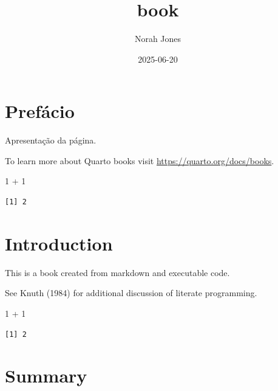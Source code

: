 \documentclass[
  letterpaper,
  DIV=11,
  numbers=noendperiod]{scrreprt}
\title{book}
\author{Norah Jones}
\date{2025-06-20}
\newenvironment{Shaded}{\begin{snugshade}}{\end{snugshade}}
\newcommand{\DecValTok}[1]{\textcolor[rgb]{0.68,0.00,0.00}{#1}}
\newcommand{\SpecialCharTok}[1]{\textcolor[rgb]{0.37,0.37,0.37}{#1}}
\renewcommand*\contentsname{Table of contents}
\newcommand\contentsname{Table of contents}
\begin{document}
\maketitle

\renewcommand*\contentsname{Table of contents}
{
\hypersetup{linkcolor=}
\setcounter{tocdepth}{2}
\tableofcontents
}


\chapter*{Prefácio}\label{prefuxe1cio}


Apresentação da página.

To learn more about Quarto books visit
\url{https://quarto.org/docs/books}.

\begin{Shaded}
\begin{Highlighting}[]
\DecValTok{1} \SpecialCharTok{+} \DecValTok{1}
\end{Highlighting}
\end{Shaded}

\begin{verbatim}
[1] 2
\end{verbatim}


\chapter{Introduction}\label{introduction}

This is a book created from markdown and executable code.

See Knuth (1984) for additional discussion of literate programming.

\begin{Shaded}
\begin{Highlighting}[]
\DecValTok{1} \SpecialCharTok{+} \DecValTok{1}
\end{Highlighting}
\end{Shaded}

\begin{verbatim}
[1] 2
\end{verbatim}


\chapter{Summary}\label{summary}
\end{document}
